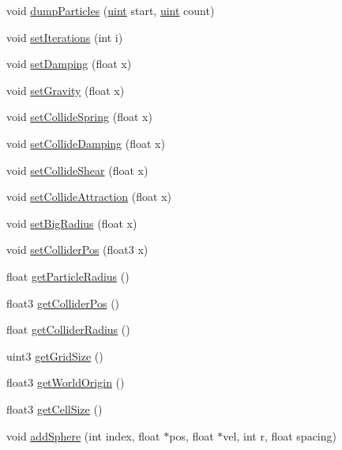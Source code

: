 \begin{DoxyCompactItemize}
\item 
void \hyperlink{class_particle_system_a9025f319e07c58c6ece1cd2a620ce33a}{dump\-Particles} (\hyperlink{particles__kernel_8cuh_a91ad9478d81a7aaf2593e8d9c3d06a14}{uint} start, \hyperlink{particles__kernel_8cuh_a91ad9478d81a7aaf2593e8d9c3d06a14}{uint} count)
\item 
void \hyperlink{class_particle_system_a11f55976f6ef34dceea208fbe06694cd}{set\-Iterations} (int i)
\item 
void \hyperlink{class_particle_system_aa26996b9ca13499b13f944f3aaeae10c}{set\-Damping} (float x)
\item 
void \hyperlink{class_particle_system_a755f64f917389ef41df81b663d1f5bd2}{set\-Gravity} (float x)
\item 
void \hyperlink{class_particle_system_a7ed53fca9ef126898d29314478ec8fd4}{set\-Collide\-Spring} (float x)
\item 
void \hyperlink{class_particle_system_a8f8d21c7079c3a0e66558b9ec5bef597}{set\-Collide\-Damping} (float x)
\item 
void \hyperlink{class_particle_system_aea667093542a1bdad65bdcb427e5625f}{set\-Collide\-Shear} (float x)
\item 
void \hyperlink{class_particle_system_aef02d293e3dc61c50fa6d085aa0b03de}{set\-Collide\-Attraction} (float x)
\item 
void \hyperlink{class_particle_system_a97efe00aa29307ecae0165da33d4770a}{set\-Big\-Radius} (float x)
\item 
void \hyperlink{class_particle_system_a9c49794585cad649de400dc7375d7801}{set\-Collider\-Pos} (float3 x)
\item 
float \hyperlink{class_particle_system_abdb59a91d8483017ad71455bb2958993}{get\-Particle\-Radius} ()
\item 
float3 \hyperlink{class_particle_system_a3c8578d474f5a6f14d903a242aec96ec}{get\-Collider\-Pos} ()
\item 
float \hyperlink{class_particle_system_a56f07dfab9d5cbf510c6e0a28e816038}{get\-Collider\-Radius} ()
\item 
uint3 \hyperlink{class_particle_system_af94ba180bcb348afcfd81bb699d6aab0}{get\-Grid\-Size} ()
\item 
float3 \hyperlink{class_particle_system_a19d9bb799a5b5704d8fd6a286f6be20d}{get\-World\-Origin} ()
\item 
float3 \hyperlink{class_particle_system_a608bcb87f3d30fbfeae810da28ae1052}{get\-Cell\-Size} ()
\item 
void \hyperlink{class_particle_system_af2f16676fe8a0523cfb867a9a856970c}{add\-Sphere} (int index, float $\ast$pos, float $\ast$vel, int r, float spacing)
\end{DoxyCompactItemize}
